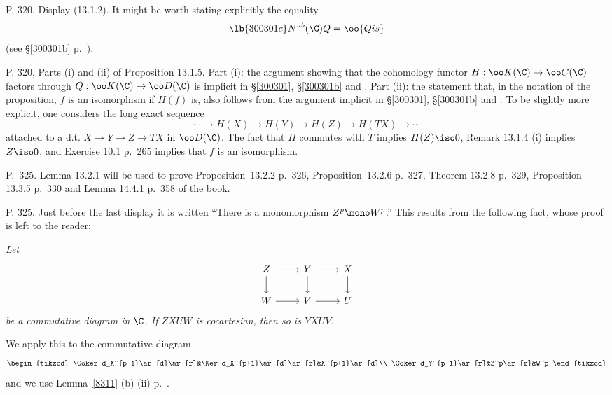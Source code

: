 \documentclass[12pt]{article}
\theoremstyle{remark}
\theoremstyle{definition}
\begin{document}

\begin{s}
P. 320, Display (13.1.2). It might be worth stating explicitly the equality 
\begin{equation}\lb{300301c}
N^{ub}(\C)Q=\oo{Qis}
\end{equation}
(see \S\ref{300301b} p.~).
\end{s}

%

\begin{s}
P. 320, Parts (i) and (ii) of Proposition 13.1.5. Part (i): the argument showing that the cohomology functor $H:\oo K(\C)\to\oo C(\C)$ factors through $Q:\oo K(\C)\to\oo D(\C)$ is implicit in \S\ref{300301}, \S\ref{300301b} and . Part (ii): the statement that, in the notation of the proposition, $f$ is an isomorphism if $H(f)$ is, also follows from the argument implicit in \S\ref{300301}, \S\ref{300301b} and . To be slightly more explicit, one considers the long exact sequence 
$$
\cdots\to H(X)\to H(Y)\to H(Z)\to H(TX)\to\cdots
$$ 
attached to a d.t. $X\to Y\to Z\to TX$ in $\oo D(\C)$. The fact that $H$ commutes with $T$ implies $H(Z)\iso0$, Remark 13.1.4 (i) implies $Z\iso0$, and Exercise 10.1 p.~265 implies that $f$ is an isomorphism.
\end{s}



\begin{s} 
P.~325. Lemma 13.2.1 will be used to prove Proposition~13.2.2 p.~326, Proposition~13.2.6 p.~327, Theorem 13.2.8 p.~329, Proposition 13.3.5 p.~330 and Lemma 14.4.1 p.~358 of the book. 
\end{s}

%

\begin{s}
P. 325. Just before the last display it is written ``There is a monomorphism $Z^p\mono W^p$.'' This results from the following fact, whose proof is left to the reader:

\nn\emph{Let}  
$$
\begin{tikzcd}
Z\ar[d]\ar[r]&Y\ar[d]\ar[r]&X\ar[d]\\ 
W\ar[r]&V\ar[r]&U
\end{tikzcd}
$$ 
\emph{be a commutative diagram in $\C$. If $ZXUW$ is cocartesian, then so is $YXUV$.}

We apply this to the commutative diagram 
$$
\begin{tikzcd}
\Coker d_X^{p-1}\ar[d]\ar[r]&\Ker d_X^{p+1}\ar[d]\ar[r]&X^{p+1}\ar[d]\\ 
\Coker d_Y^{p-1}\ar[r]&Z^p\ar[r]&W^p
\end{tikzcd}
$$ 
and we use Lemma~\ref{8311} (b) (ii) p.~.
\end{s}
\end{document}
